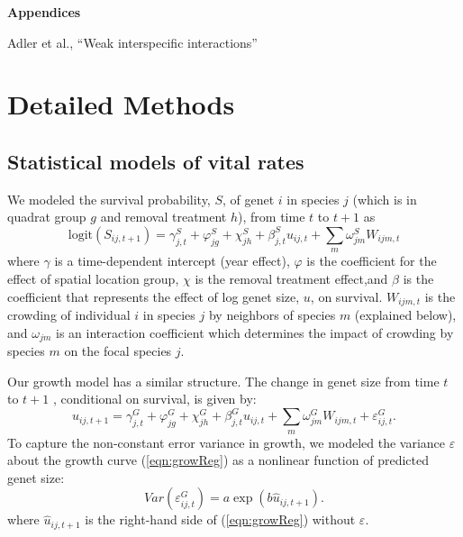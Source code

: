 \documentclass[11pt]{article}
\begin{document}

\clearpage 
\newpage 

\setcounter{page}{1}
\setcounter{equation}{0}
\setcounter{figure}{0}
\setcounter{section}{0}
\setcounter{table}{0}

\centerline{\Large \textbf{Appendices}}
\centerline{Adler et al., ``Weak interspecific interactions''} 

\vspace{0.4in} 

\renewcommand{\theequation}{A-\arabic{equation}}
\renewcommand{\thetable}{A-\arabic{table}}
\renewcommand{\thefigure}{A-\arabic{figure}}
\renewcommand{\thesection}{\Alph{section}}

\section{Detailed Methods} 
\label{AppendixA}

\subsection{Statistical models of vital rates}

We modeled the survival probability, $S$, of genet $i$ in species $j$ (which is in quadrat group $g$ and removal treatment $h$), 
from time $t$ to $t+1$  as
\begin{equation}
\mbox{logit}(S_{ij,t+1}) = \gamma_{j,t}^S + \varphi_{jg}^S+  \chi_{jh}^S  + \beta_{j,t}^S u_{ij,t} +  
\sum \limits_{m} \omega_{jm}^S {W}_{ijm,t}
\label{eqn:survReg}
\end{equation}
where $\gamma$ is a time-dependent intercept (year effect), $\varphi$ is the coefficient for the 
effect of spatial location group, $\chi$ is the removal treatment effect,and  $\beta$ is the coefficient that 
represents the effect of log genet size, $u$, on survival. 
$W_{ijm,t}$ is the crowding of individual $i$ in species $j$ by neighbors of species $m$ (explained below), and 
$\omega_{jm}$ is an interaction coefficient which determines the impact of crowding by species $m$ on the focal species $j$. 

Our growth model has a similar structure. The change in genet size from time $t$ to $t+1$ , conditional on survival, is given by:
\begin{equation}
u_{ij,t+1} = \gamma_{j,t}^G + \varphi_{jg}^G+  \chi_{jh}^G  + \beta_{j,t}^G u_{ij,t} + 
\sum \limits_{m} \omega_{jm}^G {W}_{ijm,t} + \varepsilon_{ij,t}^G .
\label{eqn:growReg}
\end{equation}
To capture the non-constant error variance in growth, we modeled the variance $\varepsilon$ about the growth 
curve (\ref{eqn:growReg}) as a nonlinear function of predicted genet size:
\begin{equation}
Var(\varepsilon_{ij,t}^G) = a \exp(b\hat{u}_{ij,t+1}).
\label{eqn:growVar}
\end{equation}
where $\hat{u}_{ij,t+1}$ is the right-hand side of (\ref{eqn:growReg}) without $\varepsilon$. 
\end{document}
